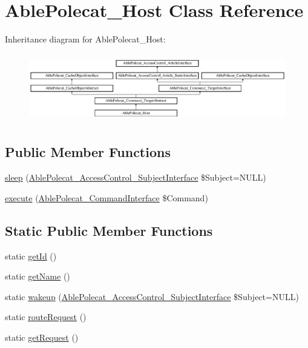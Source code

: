 \hypertarget{class_able_polecat___host}{}\section{Able\+Polecat\+\_\+\+Host Class Reference}
\label{class_able_polecat___host}
Inheritance diagram for Able\+Polecat\+\_\+\+Host\+:\begin{figure}[H]
\begin{center}
\leavevmode
\includegraphics[height=3.010753cm]{class_able_polecat___host}
\end{center}
\end{figure}
\subsection*{Public Member Functions}
\begin{DoxyCompactItemize}
\item 
\hyperlink{class_able_polecat___host_a365e24d7b066205cafa2a5cce3a4f224}{sleep} (\hyperlink{interface_able_polecat___access_control___subject_interface}{Able\+Polecat\+\_\+\+Access\+Control\+\_\+\+Subject\+Interface} \$Subject=N\+U\+L\+L)
\item 
\hyperlink{class_able_polecat___host_aa7f01cbd17bffdbbb7511a3c37756064}{execute} (\hyperlink{interface_able_polecat___command_interface}{Able\+Polecat\+\_\+\+Command\+Interface} \$Command)
\end{DoxyCompactItemize}
\subsection*{Static Public Member Functions}
\begin{DoxyCompactItemize}
\item 
static \hyperlink{class_able_polecat___host_acfaa3a96d0cb5a4c0d4d710dcba41e9e}{get\+Id} ()
\item 
static \hyperlink{class_able_polecat___host_a4ef9bd37ba3ce8a13c1e8bcf4f72a630}{get\+Name} ()
\item 
static \hyperlink{class_able_polecat___host_a3f2135f6ad45f51d075657f6d20db2cd}{wakeup} (\hyperlink{interface_able_polecat___access_control___subject_interface}{Able\+Polecat\+\_\+\+Access\+Control\+\_\+\+Subject\+Interface} \$Subject=N\+U\+L\+L)
\item 
static \hyperlink{class_able_polecat___host_a8133d3834528b23c3532c2435512a5e0}{route\+Request} ()
\item 
static \hyperlink{class_able_polecat___host_a8bc323d82e5265f16d9cd356d0a02dba}{get\+Request} ()
\end{DoxyCompactItemize}
